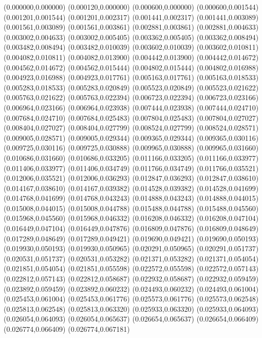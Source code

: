 (0.000000,0.000000)
(0.000120,0.000000)
(0.000600,0.000000)
(0.000600,0.001544)
(0.001201,0.001544)
(0.001201,0.002317)
(0.001441,0.002317)
(0.001441,0.003089)
(0.001561,0.003089)
(0.001561,0.003861)
(0.002881,0.003861)
(0.002881,0.004633)
(0.003002,0.004633)
(0.003002,0.005405)
(0.003362,0.005405)
(0.003362,0.008494)
(0.003482,0.008494)
(0.003482,0.010039)
(0.003602,0.010039)
(0.003602,0.010811)
(0.004082,0.010811)
(0.004082,0.013900)
(0.004442,0.013900)
(0.004442,0.014672)
(0.004562,0.014672)
(0.004562,0.015444)
(0.004802,0.015444)
(0.004802,0.016988)
(0.004923,0.016988)
(0.004923,0.017761)
(0.005163,0.017761)
(0.005163,0.018533)
(0.005283,0.018533)
(0.005283,0.020849)
(0.005523,0.020849)
(0.005523,0.021622)
(0.005763,0.021622)
(0.005763,0.022394)
(0.006723,0.022394)
(0.006723,0.023166)
(0.006964,0.023166)
(0.006964,0.023938)
(0.007444,0.023938)
(0.007444,0.024710)
(0.007684,0.024710)
(0.007684,0.025483)
(0.007804,0.025483)
(0.007804,0.027027)
(0.008404,0.027027)
(0.008404,0.027799)
(0.008524,0.027799)
(0.008524,0.028571)
(0.009005,0.028571)
(0.009005,0.029344)
(0.009365,0.029344)
(0.009365,0.030116)
(0.009725,0.030116)
(0.009725,0.030888)
(0.009965,0.030888)
(0.009965,0.031660)
(0.010686,0.031660)
(0.010686,0.033205)
(0.011166,0.033205)
(0.011166,0.033977)
(0.011406,0.033977)
(0.011406,0.034749)
(0.011766,0.034749)
(0.011766,0.035521)
(0.012006,0.035521)
(0.012006,0.036293)
(0.012847,0.036293)
(0.012847,0.038610)
(0.014167,0.038610)
(0.014167,0.039382)
(0.014528,0.039382)
(0.014528,0.041699)
(0.014768,0.041699)
(0.014768,0.043243)
(0.014888,0.043243)
(0.014888,0.044015)
(0.015008,0.044015)
(0.015008,0.044788)
(0.015488,0.044788)
(0.015488,0.045560)
(0.015968,0.045560)
(0.015968,0.046332)
(0.016208,0.046332)
(0.016208,0.047104)
(0.016449,0.047104)
(0.016449,0.047876)
(0.016809,0.047876)
(0.016809,0.048649)
(0.017289,0.048649)
(0.017289,0.049421)
(0.019690,0.049421)
(0.019690,0.050193)
(0.019930,0.050193)
(0.019930,0.050965)
(0.020291,0.050965)
(0.020291,0.051737)
(0.020531,0.051737)
(0.020531,0.053282)
(0.021371,0.053282)
(0.021371,0.054054)
(0.021851,0.054054)
(0.021851,0.055598)
(0.022572,0.055598)
(0.022572,0.057143)
(0.022812,0.057143)
(0.022812,0.058687)
(0.022932,0.058687)
(0.022932,0.059459)
(0.023892,0.059459)
(0.023892,0.060232)
(0.024493,0.060232)
(0.024493,0.061004)
(0.025453,0.061004)
(0.025453,0.061776)
(0.025573,0.061776)
(0.025573,0.062548)
(0.025813,0.062548)
(0.025813,0.063320)
(0.025933,0.063320)
(0.025933,0.064093)
(0.026054,0.064093)
(0.026054,0.065637)
(0.026654,0.065637)
(0.026654,0.066409)
(0.026774,0.066409)
(0.026774,0.067181)
